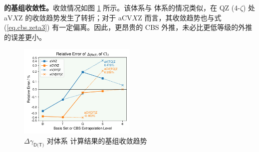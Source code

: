 \textbf{ 的基组收敛性。}收敛情况如图 \ref{fig.Cl2-aniso} 所示。该体系与  体系的情况类似，在 QZ (4-$\zeta$) 处 aV$X$Z 的收敛趋势发生了转折；对于 aCV$X$Z 而言，其收敛趋势也与式 (\ref{eq.cbs.zeta3}) 有一定偏离。因此，更昂贵的 CBS 外推，未必比更低等级的外推的误差更小。

\begin{figure}[ht]
    \centering
    \caption{$\Delta \gamma_\textsf{D(T)}$ 对体系  计算结果的基组收敛趋势}
    \label{fig.Cl2-aniso}
    \includegraphics[width=0.5\textwidth]{assets/Cl2-aniso.pdf}
\end{figure}

\newpage




